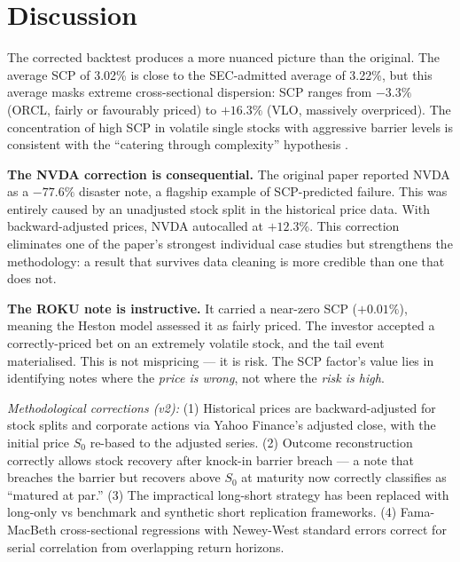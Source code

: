 \documentclass[10pt,a4paper]{article}
\begin{document}
\newpage\section{Discussion}\label{sec:disc}
The corrected backtest produces a more nuanced picture than the original. The average SCP of 3.02\% is close to the SEC-admitted average of 3.22\%, but this average masks extreme cross-sectional dispersion: SCP ranges from $-3.3\%$ (ORCL, fairly or favourably priced) to $+16.3\%$ (VLO, massively overpriced). The concentration of high SCP in volatile single stocks with aggressive barrier levels is consistent with the ``catering through complexity'' hypothesis \citep{celerier2017}.

\textbf{The NVDA correction is consequential.} The original paper reported NVDA as a $-77.6\%$ disaster note, a flagship example of SCP-predicted failure. This was entirely caused by an unadjusted stock split in the historical price data. With backward-adjusted prices, NVDA autocalled at $+12.3\%$. This correction eliminates one of the paper's strongest individual case studies but strengthens the methodology: a result that survives data cleaning is more credible than one that does not.

\textbf{The ROKU note is instructive.} It carried a near-zero SCP ($+0.01\%$), meaning the Heston model assessed it as fairly priced. The investor accepted a correctly-priced bet on an extremely volatile stock, and the tail event materialised. This is not mispricing --- it is risk. The SCP factor's value lies in identifying notes where the \emph{price is wrong}, not where the \emph{risk is high}.

\textit{Methodological corrections (v2):} (1) Historical prices are backward-adjusted for stock splits and corporate actions via Yahoo Finance's adjusted close, with the initial price $S_0$ re-based to the adjusted series. (2) Outcome reconstruction correctly allows stock recovery after knock-in barrier breach --- a note that breaches the barrier but recovers above $S_0$ at maturity now correctly classifies as ``matured at par.'' (3) The impractical long-short strategy has been replaced with long-only vs benchmark and synthetic short replication frameworks. (4) Fama-MacBeth cross-sectional regressions with Newey-West standard errors correct for serial correlation from overlapping return horizons.
\end{document}
